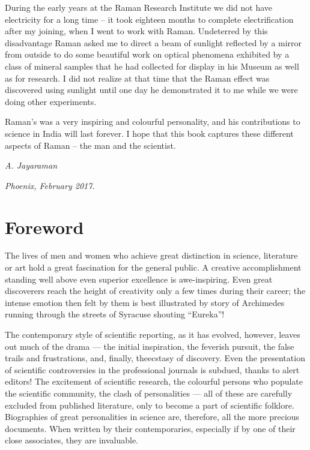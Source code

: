 During the early years at the Raman Research Institute we did not have electricity for a long time -- it took eighteen months to complete electrification after my joining, when I went to work with Raman. Undeterred by this disadvantage Raman asked me to direct a beam of sunlight reflected by a mirror from outside to do some beautiful work on optical phenomena exhibited by a class of mineral samples that he had collected for display in his Museum as well as for research. I did not realize at that time that the Raman effect was discovered using sunlight until one day he demonstrated it to me while we were doing other experiments.  

Raman's was a very inspiring and colourful personality, and his contributions to science in India will last forever. I hope that this book captures these different aspects of Raman -- the man and the scientist. 

\bigskip
\bigskip


\hfill {\em A. Jayaraman}\quad~\,

\hfill
{\em Phoenix, February 2017.}


\chapter*{Foreword}

The lives of men and women who achieve great distinction in science, literature or art hold a great fascination for the general public. A creative accomplishment standing well above even superior excellence is awe-inspiring. Even great discoverers reach the height of creativity only a few times during their career; the intense emotion then felt by them is best illustrated by story of Archimedes running through the streets of Syracuse shouting ``Eureka''!

The contemporary style of scientific reporting, as it has evolved, however, leaves out much of the drama --- the initial inspiration, the feverish pursuit, the false trails and frustrations, and, finally, the\break ecstasy of discovery. Even the presentation of scientific controversies in the professional journals is subdued, thanks to alert editors! The excitement of scientific research, the colourful persons who populate the scientific community, the clash of personalities --- all of these are carefully excluded from published literature, only to become a part of scientific folklore. Biographies of great personalities in science are, therefore, all the more precious documents. When written by their contemporaries, especially if by one of their close associates, they are invaluable.

